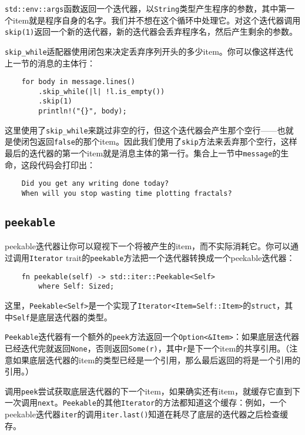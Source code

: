 \texttt{std::env::args}函数返回一个迭代器，以\texttt{String}类型产生程序的参数，其中第一个item就是程序自身的名字。我们并不想在这个循环中处理它。对这个迭代器调用\texttt{skip(1)}返回一个新的迭代器，新的迭代器会丢弃程序名，然后产生剩余的参数。

\texttt{skip\_while}适配器使用闭包来决定丢弃序列开头的多少item。你可以像这样迭代上一节的消息的主体行：
\begin{verbatim}
    for body in message.lines()
        .skip_while(|l| !l.is_empty())
        .skip(1)
        println!("{}", body);
\end{verbatim}

这里使用了\texttt{skip\_while}来跳过非空的行，但这个迭代器会产生那个空行——也就是使闭包返回\texttt{false}的那个item。因此我们使用了\texttt{skip}方法来丢弃那个空行，这样最后的迭代器的第一个item就是消息主体的第一行。集合上一节中\texttt{message}的生命，这段代码会打印出：
\begin{verbatim}
    Did you get any writing done today?
    When will you stop wasting time plotting fractals?
\end{verbatim}

\subsection{\texttt{peekable}}
peekable迭代器让你可以窥视下一个将被产生的item，而不实际消耗它。你可以通过调用\texttt{Iterator} trait的\texttt{peekable}方法把一个迭代器转换成一个peekable迭代器：
\begin{verbatim}
    fn peekable(self) -> std::iter::Peekable<Self>
        where Self: Sized;
\end{verbatim}
这里，\texttt{Peekable<Self>}是一个实现了\texttt{Iterator<Item=Self::Item>}的\texttt{struct}，其中\texttt{Self}是底层迭代器的类型。

\texttt{Peekable}迭代器有一个额外的\texttt{peek}方法返回一个\texttt{Option<\&Item>}：如果底层迭代器已经迭代完就返回\texttt{None}，否则返回\texttt{Some(r)}，其中\texttt{r}是下一个item的共享引用。（注意如果底层迭代器的item的类型已经是一个引用，那么最后返回的将是一个引用的引用。）

调用\texttt{peek}尝试获取底层迭代器的下一个item，如果确实还有item，就缓存它直到下一次调用\texttt{next}。\texttt{Peekable}的其他\texttt{Iterator}的方法都知道这个缓存：例如，一个peekable迭代器\texttt{iter}的调用\texttt{iter.last()}知道在耗尽了底层的迭代器之后检查缓存。

